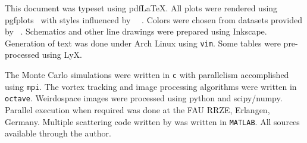 This document was typeset using pdf\LaTeX. All plots were rendered using
pgfplots~\cite{feuersangerpgfplots} with styles influenced by
~\cite{tufte1983visual}~\cite{tufte1991envisioning}.
Colors were chosen from datasets provided by
~\cite{harrower2003colorbrewer}.  Schematics and other
line drawings were prepared using Inkscape. Generation of text was done
under Arch Linux using \texttt{vim}.  Some tables were pre-processed using
LyX.

The Monte Carlo simulations were written in \texttt{c} with parallelism
accomplished using \texttt{mpi}. The vortex tracking and image processing
algorithms were written in \texttt{octave}.  Weirdospace images were
processed using python and scipy/numpy.  Parallel execution when required
was done at the FAU RRZE, Erlangen, Germany.  Multiple scattering code
written by  was written in \texttt{MATLAB}.  All sources
available through the author.
